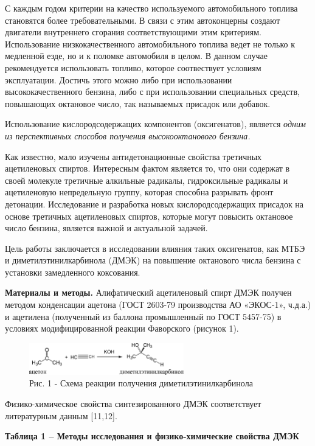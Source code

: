 \begin{multicols}{2}
С каждым годом критерии на качество используемого автомобильного топлива
становятся более требовательными. В связи с этим автоконцерны создают
двигатели внутреннего сгорания соответствующими этим критериям.
Использование низкокачественного автомобильного топлива ведет не только
к медленной езде, но и к поломке автомобиля в целом. В данном случае
рекомендуется использовать топливо, которое соотвествует условиям
эксплуатации. Достичь этого можно либо при использовании
высококачественного бензина, либо с при использовании специальных
средств, повышающих октановое число, так называемых присадок или
добавок.

Использование кислородсодержащих компонентов (оксигенатов), является
\emph{одним из перспективных способов получения высокооктанового
бензина.}

Как известно, мало изучены антидетонационные свойства третичных
ацетиленовых спиртов. Интересным фактом является то, что они содержат в
своей молекуле третичные алкильные радикалы, гидроксильные радикалы и
ацетиленовую непредельную группу, которая способна разрывать фронт
детонации. Исследование и разработка новых кислородсодержащих присадок
на основе третичных ацетиленовых спиртов, которые могут повысить
октановое число бензина, является важной и актуальной задачей.

Цель работы заключается в исследовании влияния таких оксигенатов, как
МТБЭ и диметилэтинилкарбинола (ДМЭК) на повышение октанового числа
бензина с установки замедленного коксования.

{\bfseries Материалы и методы.} Алифатический ацетиленовый спирт ДМЭК
получен методом конденсации ацетона (ГОСТ 2603-79 производства АО
«ЭКОС-1», ч.д.а.) и ацетилена (полученный из баллона промышленный по
ГОСТ 5457-75) в условиях модифицированной реакции Фаворского (рисунок
1).
\end{multicols}

\begin{figure}[H]
	\centering
	\includegraphics[width=0.6\textwidth]{media/chem/image13}
	\caption*{Рис. 1 - Схема реакции получения диметилэтинилкарбинола}
\end{figure}

Физико-химическое свойства синтезированного ДМЭК соответствует
литературным данным {[}11,12{]}.

{\bfseries Таблица 1 -- Методы исследования и физико-химические свойства
ДМЭК}

